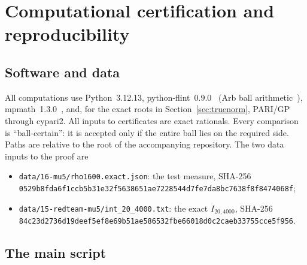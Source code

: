 \documentclass[11pt]{article}
\theoremstyle{remark}
\newcommand{\file}[1]{\texttt{#1}}
\begin{document}
\section{Computational certification and reproducibility}\label{sec:comp}

\subsection{Software and data}

All computations use Python~3.12.13, python-flint~0.9.0~\cite{flint} (Arb ball arithmetic~\cite{Jo}), mpmath~1.3.0~\cite{mpmath}, and, for the exact roots in Section~\ref{sec:truenorm}, PARI/GP~\cite{PARI} through cypari2. All inputs to certificates are exact rationals. Every comparison is ``ball-certain'': it is accepted only if the entire ball lies on the required side. Paths are relative to the root of the accompanying repository. The two data inputs to the proof are
\begin{itemize}
\item \file{data/16-mu5/rho1600.exact.json}: the test measure, SHA-256 \file{0529b8fda6f1ccb5b31e32f5638651ae7228544d7fe7da8bc7638f8f8474068f};
\item \file{data/15-redteam-mu5/int\_20\_4000.txt}: the exact $I_{20,4000}$, SHA-256 \file{84c23d2736d19deef5ef8e69b51ae586532fbe66018d0c2caeb33755cce5f956}.
\end{itemize}

\subsection{The main script}
\end{document}

